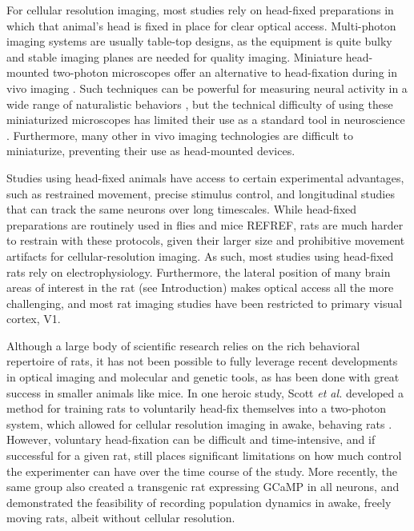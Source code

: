 For cellular resolution imaging, most studies rely on head-fixed preparations in which that animal's head is fixed in place for clear optical access. Multi-photon imaging systems are usually table-top designs, as the equipment is quite bulky and stable imaging planes are needed for quality imaging. Miniature head-mounted two-photon microscopes offer an alternative to head-fixation during in vivo imaging \cite{Helmchen2001, Piyawattanametha2009, Sawinski2009}. Such techniques can be powerful for measuring neural activity in a wide range of naturalistic behaviors \cite{Sawinski2009}, but the technical difficulty of using these miniaturized microscopes has limited their use as a standard tool in neuroscience \cite{Kerr2012}. Furthermore, many other in vivo imaging technologies are difficult to miniaturize, preventing their use as head-mounted devices. 

Studies using head-fixed animals have access to certain experimental advantages, such as restrained movement, precise stimulus control, and longitudinal studies that can track the same neurons over long timescales. While head-fixed preparations are routinely used in flies and mice {REFREF}, rats are much harder to restrain with these protocols, given their larger size and prohibitive movement artifacts for cellular-resolution imaging. As such, most studies using head-fixed rats rely on electrophysiology. Furthermore, the lateral position of many brain areas of interest in the rat (see Introduction) makes optical access all the more challenging, and most rat imaging studies have been restricted to primary visual cortex, V1\cite{Greenberg2008, Ohki2005, Scott2018}.

Although a large body of scientific research relies on the rich behavioral repertoire of rats, it has not been possible to fully leverage recent developments in optical imaging and molecular and genetic tools, as has been done with great success in smaller animals like mice. In one heroic study, Scott \textit{et al.} developed a method for training rats to voluntarily head-fix themselves into a two-photon system, which allowed for cellular resolution imaging in awake, behaving rats \cite{Scott2013}. However, voluntary head-fixation can be difficult and time-intensive, and if successful for a given rat, still places significant limitations on how much control the experimenter can have over the time course of the study. More recently, the same group also created a transgenic rat expressing GCaMP in all neurons, and demonstrated the feasibility of recording population dynamics in awake, freely moving rats, albeit without cellular resolution\cite{Scott2018ImagingMacroscope}. 

